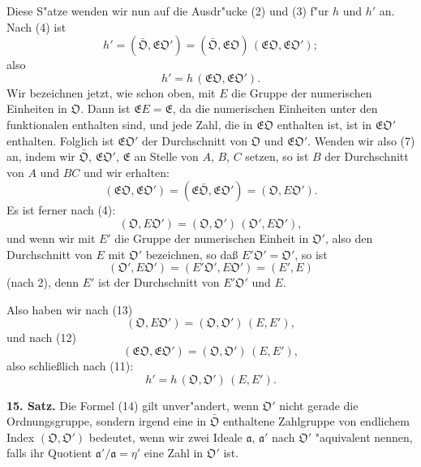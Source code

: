 \documentclass[12pt,a4paper]{article}
\theoremstyle{plain}
\begin{document}
Diese S"atze wenden wir nun auf die Ausdr"ucke (2) und (3) f"ur $h$ und $h'$ an. Nach (4) ist
\begin{equation}
h' = (\bar{\mathfrak{O}}, \mathfrak{E}\mathfrak{O}') = (\bar{\mathfrak{O}}, \mathfrak{E}\mathfrak{O})\,(\mathfrak{E}\mathfrak{O}, \mathfrak{E}\mathfrak{O}');
\tag{10}
\end{equation}
also
\begin{equation}
h' = h\,(\mathfrak{E}\mathfrak{O}, \mathfrak{E}\mathfrak{O}').
\tag{11}
\end{equation}
Wir bezeichnen jetzt, wie schon oben, mit $E$ die Gruppe der numerischen Einheiten in $\mathfrak{O}$. Dann ist $\mathfrak{E}E = \mathfrak{E}$, da die numerischen Einheiten unter den funktionalen enthalten sind, und jede Zahl, die in $\mathfrak{E}\mathfrak{O}$ enthalten ist, ist in $\mathfrak{E}\mathfrak{O}'$ enthalten. Folglich ist $\mathfrak{E}\mathfrak{O}'$ der Durchschnitt von $\mathfrak{O}$ und $\mathfrak{E}\mathfrak{O}'$. Wenden wir also (7) an, indem wir $\bar{\mathfrak{O}}$, $\mathfrak{E}\mathfrak{O}'$, $\mathfrak{E}$ an Stelle von $A$, $B$, $C$ setzen, so ist $B$ der Durchschnitt von $A$ und $BC$ und wir erhalten:
\begin{equation}
(\mathfrak{E}\mathfrak{O}, \mathfrak{E}\mathfrak{O}') = (\mathfrak{E}\bar{\mathfrak{O}}, \mathfrak{E}\mathfrak{O}') = (\mathfrak{O}, E\mathfrak{O}').
\tag{12}
\end{equation}
Es ist ferner nach (4):
\begin{equation}
(\mathfrak{O}, E\mathfrak{O}') = (\mathfrak{O}, \mathfrak{O}')\,(\mathfrak{O}', E\mathfrak{O}'),
\tag{13}
\end{equation}
und wenn wir mit $E'$ die Gruppe der numerischen Einheit in $\mathfrak{O}'$, also den Durchschnitt von $E$ mit $\mathfrak{O}'$ bezeichnen, so da\ss{} $E'\mathfrak{O}' = \mathfrak{O}'$, so ist
\[
(\mathfrak{O}', E\mathfrak{O}') = (E'\mathfrak{O}', E\mathfrak{O}') = (E', E)
\]
(nach 2), denn $E'$ ist der Durchschnitt von $E'\mathfrak{O}'$ und $E$.

Also haben wir nach (13)
\[
(\mathfrak{O}, E\mathfrak{O}') = (\mathfrak{O}, \mathfrak{O}')\,(E, E'),
\]
und nach (12)
\[
(\mathfrak{E}\mathfrak{O}, \mathfrak{E}\mathfrak{O}') = (\mathfrak{O}, \mathfrak{O}')\,(E, E'),
\]
also schlie\ss lich nach (11):
\begin{equation}
h' = h\,(\mathfrak{O}, \mathfrak{O}')\,(E, E').
\tag{14}
\end{equation}

\textbf{15. Satz.} Die Formel (14) gilt unver"andert, wenn $\mathfrak{O}'$ nicht gerade die Ordnungsgruppe, sondern irgend eine in $\bar{\mathfrak{O}}$ enthaltene Zahlgruppe von endlichem Index $(\mathfrak{O}, \mathfrak{O}')$ bedeutet, wenn wir zwei Ideale $\mathfrak{a}$, $\mathfrak{a}'$ nach $\mathfrak{O}'$ "aquivalent nennen, falls ihr Quotient $\mathfrak{a}'/\mathfrak{a} = \eta'$ eine Zahl in $\mathfrak{O}'$ ist.
\end{document}
